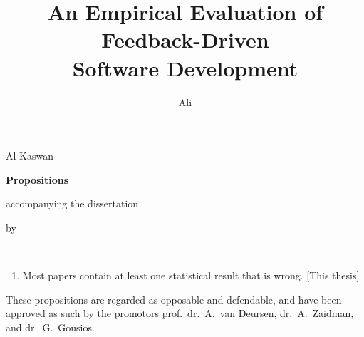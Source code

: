 \documentclass{propositions}
\begin{document}
\title{An Empirical Evaluation of Feedback-Driven \\Software Development}
\author{Ali}{Al-Kaswan}

\begin{center}

{\Large\titlefont\bfseries Propositions}

\medskip

accompanying the dissertation

\medskip

{\makeatletter
\titlestyle\bfseries\large\@title
\makeatother}

{\makeatletter
\ifx\@subtitle\undefined\else
    \titlefont\titleshape\@subtitle
\fi
\makeatother}

\medskip

by

\medskip

\makeatletter
{\large\titlefont\bfseries\@firstname\ {\titleshape\@lastname}}
\makeatother

\end{center}

\bigskip

\begin{enumerate}
\item Most papers contain at least one statistical result that is wrong. [This
  thesis]
\end{enumerate}

\bigskip
\bigskip

\begin{center}
These propositions are regarded as opposable and defendable, and have been approved as such by the
promotors prof.\ dr.\ A.\ van Deursen, dr.\ A.\ Zaidman, and dr.\ G.\ Gousios.
\end{center}





\end{document}
